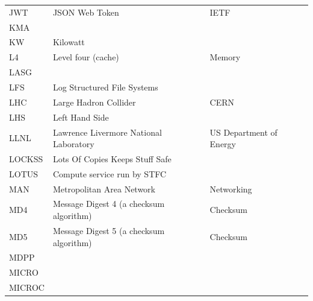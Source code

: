 \documentclass{../../template/esiwace-report}
\begin{document}
\begin{longtable}{|l|l|l|}
  JWT         &       JSON Web Token                                  &       IETF                            \\
  KMA         &                                                       &                                       \\
  KW          &         Kilowatt                                      &                                       \\
  L4          &         Level four (cache)                            &         Memory                        \\
  LASG        &                                                       &                                       \\
  LFS         &         Log Structured File Systems                   &                                       \\
  LHC         &       Large Hadron Collider                           &       CERN                            \\
  LHS         &         Left Hand Side                                &                                       \\
  LLNL        &         Lawrence Livermore National Laboratory        &         US Department of Energy       \\
  LOCKSS      &       Lots Of Copies Keeps Stuff Safe                 &                                       \\
  LOTUS       &       Compute service run by STFC                     &                                       \\
  MAN         &       Metropolitan Area Network                       &       Networking                      \\
  MD4         &       Message Digest 4 (a checksum algorithm)         &         Checksum                      \\
  MD5         &       Message Digest 5 (a checksum algorithm)         &         Checksum                      \\
  MDPP        &                                                       &                                       \\
  MICRO       &                                                       &                                       \\
  MICROC      &                                                       &                                       \\

\end{longtable}
\end{document}
